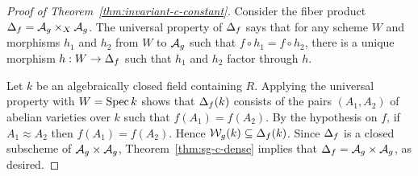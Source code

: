 \documentclass{amsart}
\begin{document}
\begin{proof}[Proof of Theorem~\ref{thm:invariant-c-constant}]
  Consider the fiber product $\Delta_f = \mathcal{A}_g \times_X \mathcal{A}_g$.
  The universal property of $\Delta_f$ says that for any scheme $W$ and morphisms $h_1$ and $h_2$ from $W$ to $\mathcal{A}_g$ such that $f \circ h_1 = f \circ h_2$, there is a unique morphism $h: W \to \Delta_f$ such that $h_1$ and $h_2$ factor through $h$.

  Let $k$ be an algebraically closed field containing $R$.
  Applying the universal property with $W = \operatorname{Spec} k$ shows that $\Delta_f(k)$ consists of the pairs $(A_1,A_2)$ of abelian varieties over $k$ such that $f(A_1) = f(A_2)$.
  By the hypothesis on $f$, if $A_1 \approx A_2$ then $f(A_1) = f(A_2)$. Hence $\mathcal{W}_g(k) \subseteq \Delta_f(k)$.
  Since $\Delta_f$ is a closed subscheme of $\mathcal{A}_g \times \mathcal{A}_g$, Theorem~\ref{thm:sg-c-dense} implies that $\Delta_f = \mathcal{A}_g \times \mathcal{A}_g$, as desired.
\end{proof}











%
\end{document}
